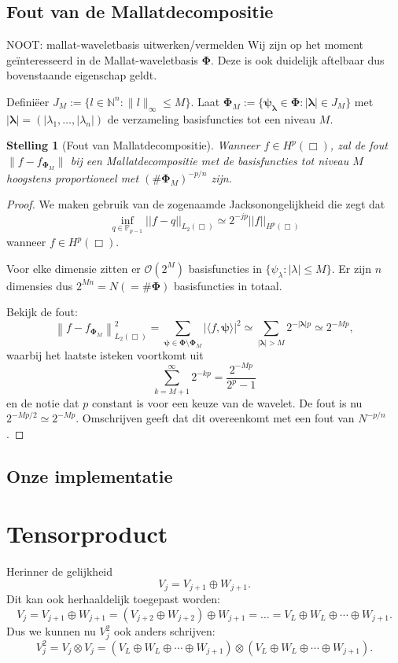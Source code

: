 \documentclass[11pt]{report}
\newcommand{\N}{\mathbb{N}}
\theoremstyle{plain}
\newtheorem*{stelling}{Stelling}
\theoremstyle{remark}
\begin{document}
\subsection{Fout van de Mallatdecompositie}
NOOT: mallat-waveletbasis uitwerken/vermelden
Wij zijn op het moment ge\"interesseerd in de Mallat-waveletbasis $\boldsymbol\Phi$. Deze is ook duidelijk aftelbaar dus bovenstaande eigenschap geldt.

Defini\"eer $J_M := \{ l \in \N^n: \| l \|_\infty \leq M \}$. Laat $\boldsymbol\Phi_M := \{ \boldsymbol{\psi}_{\boldsymbol{\lambda}} \in \boldsymbol\Phi: |\boldsymbol\lambda| \in J_M \}$ met $|\boldsymbol\lambda| = (|\lambda_1, \ldots, |\lambda_n|)$ de verzameling basisfuncties tot een niveau $M$.

\begin{stelling}[Fout van Mallatdecompositie]
Wanneer $f \in H^p(\Box)$, zal de fout $\| f - f_{\mathcal{\boldsymbol\Phi}_M} \|$ bij een Mallatdecompositie met de basisfuncties tot niveau $M$ hoogstens proportioneel met $(\# \boldsymbol\Phi_M)^{-p/n}$ zijn.
\end{stelling}
\begin{proof}

We maken gebruik van de zogenaamde Jacksonongelijkheid \cite{jackson} die zegt dat 
\[
  \inf_{q \in \mathbb{P}_{p-1}} ||f - q||_{L_2(\Box)} \simeq 2^{-jp} ||f||_{H^p(\Box)}
\]
wanneer $f \in H^p(\Box)$.

Voor elke dimensie zitten er $\mathcal{O}(2^M)$ basisfuncties in $\{ \psi_\lambda: |\lambda| \leq M \}$. Er zijn $n$ dimensies dus $2^{Mn} = N (= \# \boldsymbol\Phi)$ basisfuncties in totaal.

Bekijk de fout:
\[
  \left\| f - f_{\boldsymbol\Phi_M} \right\|^2_{L_2(\Box)} = \sum_{{\boldsymbol\psi} \in \boldsymbol\Phi \setminus \boldsymbol\Phi_M} | \langle f, \boldsymbol\psi \rangle |^2 \simeq \sum_{|\boldsymbol\lambda| > M} 2^{-|\boldsymbol\lambda|p} \simeq 2^{-Mp},
\]
waarbij het laatste isteken voortkomt uit
\[
	\sum_{k=M+1}^\infty 2^{- kp} = \frac{2^{-Mp}}{2^p-1}
\]
en de notie dat $p$ constant is voor een keuze van de wavelet. De fout is nu $2^{-Mp/2} \simeq 2^{-Mp}$. Omschrijven geeft dat dit overeenkomt met een fout van $N^{-p/n}$.
\end{proof}

\subsection{Onze implementatie}
\section{Tensorproduct}
Herinner de gelijkheid
\[
	V_{j} = V_{j+1} \oplus W_{j+1}.
\]
Dit kan ook herhaaldelijk toegepast worden:
\[
	V_j = V_{j+1} \oplus W_{j+1} = (V_{j+2} \oplus W_{j+2} ) \oplus W_{j+1} = \ldots = V_{L} \oplus W_L \oplus \cdots \oplus W_{j+1}.
\]
Dus we kunnen nu $V_j^2$ ook anders schrijven:
\[
	V_j^2 = V_j \otimes V_j = (V_{L} \oplus W_L \oplus \cdots \oplus W_{j+1}) \otimes (V_{L} \oplus W_L \oplus \cdots \oplus W_{j+1}).
\]
\end{document}

